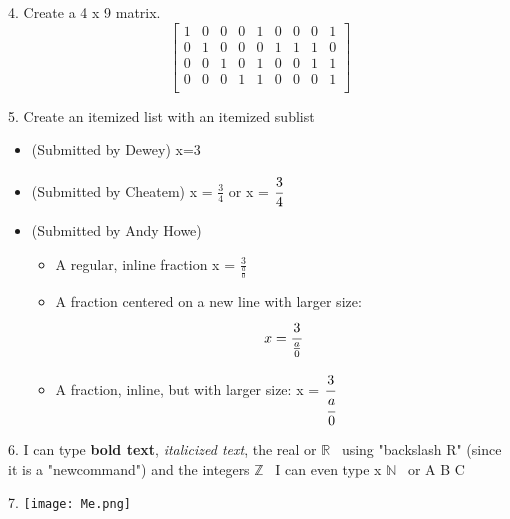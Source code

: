 \documentclass{article}
\begin{document}
4. Create a 4 x 9 matrix.
\vspace{5mm}
\[
\begin{bmatrix}
    1 & 0 & 0 & 0 & 1 & 0 & 0 & 0 & 1 \\
    0 & 1 & 0 & 0 & 0 & 1 & 1 & 1 & 0  \\
    0 & 0 & 1 & 0 & 1 & 0 & 0 & 1 & 1 \\
    0 & 0 & 0 & 1 & 1 & 0 & 0 & 0 & 1 \\
\end{bmatrix}
\]
\vspace{5mm}
    \item 
5. Create an itemized list with an itemized sublist 
\begin{itemize}    
  \item (Submitted by Dewey) x=3 
  \item (Submitted by Cheatem) x = $\frac{{3}}{{4}}$ or x = $\cfrac{{3}}{{4}}$ \\
  \item (Submitted by Andy Howe)
  \begin{itemize}
    \item A regular, inline fraction x = $\frac{{3}}{{\frac{a}{0}}}$
    \item A fraction centered on a new line with larger size:
    $$ x = \cfrac{{3}}{{\frac{a}{0}}}$$
    \item A fraction, inline, but with larger size: x = $\cfrac{{3}}{{\cfrac{a}{0}}}$
     \end{itemize}
\end{itemize}

6. I can type \textbf{bold text}, {\textit{italicized text}}, the real 
or \newcommand{\R}{\mathbb{R}} \( \R \) \ using "backslash R" (since it is a "newcommand") and the integers \newcommand{\Z}{\mathbb{Z}} \( \Z \) \
I can even type x \in \newcommand{\N}{\mathbb{N}} \( \N \) \ or A  \cap B \subseteq C

 7. 
 \vspace{5mm}
 \texttt{[image: Me.png]}
\end{document}
